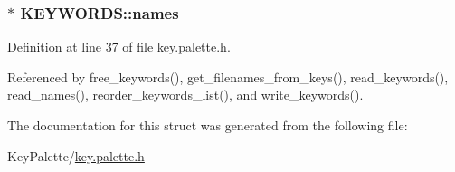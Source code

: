 \hypertarget{struct_k_e_y_w_o_r_d_s_ae1fbc7cb94e32783153884b8b5ca6b6b}{
\subsubsection[{names}]{$\ast$ K\-E\-Y\-W\-O\-R\-D\-S\-::names}}\label{struct_k_e_y_w_o_r_d_s_ae1fbc7cb94e32783153884b8b5ca6b6b}


Definition at line 37 of file key.\-palette.\-h.



Referenced by free\-\_\-keywords(), get\-\_\-filenames\-\_\-from\-\_\-keys(), read\-\_\-keywords(), read\-\_\-names(), reorder\-\_\-keywords\-\_\-list(), and write\-\_\-keywords().



The documentation for this struct was generated from the following file\-:\begin{DoxyCompactItemize}
\item 
Key\-Palette/\hyperlink{key_8palette_8h}{key.\-palette.\-h}\end{DoxyCompactItemize}
